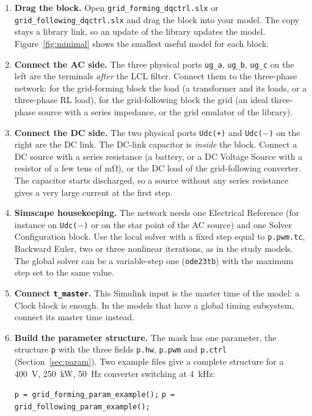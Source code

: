 \documentclass[11pt,a4paper]{scrartcl}
\newcommand{\code}[1]{\texttt{#1}}
\begin{document}
\begin{onehalfspace}
\begin{enumerate}[nosep]
	\item \textbf{Drag the block.} Open \code{grid\_forming\_dqctrl.slx} or \code{grid\_following\_dqctrl.slx} and drag the block into your model. The copy stays a library link, so an update of the library updates the model. Figure~\ref{fig:minimal} shows the smallest useful model for each block.
	\item \textbf{Connect the AC side.} The three physical ports \code{ug\_a}, \code{ug\_b}, \code{ug\_c} on the left are the terminals \emph{after} the LCL filter. Connect them to the three-phase network: for the grid-forming block the load (a transformer and its loads, or a three-phase RL load), for the grid-following block the grid (an ideal three-phase source with a series impedance, or the grid emulator of the library).
	\item \textbf{Connect the DC side.} The two physical ports \code{Udc(+)} and \code{Udc($-$)} on the right are the DC link. The DC-link capacitor is \emph{inside} the block. Connect a DC source with a series resistance (a battery, or a DC Voltage Source with a resistor of a few tens of \si{\milli\ohm}), or the DC load of the grid-following converter. The capacitor starts discharged, so a source without any series resistance gives a very large current at the first step.
	\item \textbf{Simscape housekeeping.} The network needs one Electrical Reference (for instance on \code{Udc($-$)} or on the star point of the AC source) and one Solver Configuration block. Use the local solver with a fixed step equal to \code{p.pwm.tc}, Backward Euler, two or three nonlinear iterations, as in the study models. The global solver can be a variable-step one (\code{ode23tb}) with the maximum step set to the same value.
	\item \textbf{Connect \code{t\_master}.} This Simulink input is the master time of the model: a Clock block is enough. In the models that have a global timing subsystem, connect its master time instead.
	\item \textbf{Build the parameter structure.} The mask has one parameter, the structure \code{p} with the three fields \code{p.hw}, \code{p.pwm} and \code{p.ctrl} (Section~\ref{sec:param}). Two example files give a complete structure for a \SI{400}{\volt}, \SI{250}{\kilo\watt}, \SI{50}{\hertz} converter switching at \SI{4}{\kilo\hertz}:
	\begin{center}
		\code{p = grid\_forming\_param\_example();} \qquad \code{p = grid\_following\_param\_example();}

\end{center}
\end{enumerate}
\end{onehalfspace}
\end{document}
